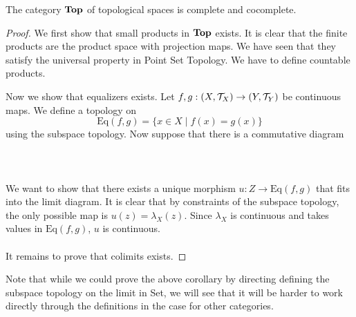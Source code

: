 \documentclass[a4paper]{article}
\begin{document}
\begin{crl}{}{} The category $\bold{Top}$ of topological spaces is complete and cocomplete. \tcbline
\begin{proof}
We first show that small products in $\bold{Top}$ exists. It is clear that the finite products are the product space with projection maps. We have seen that they satisfy the universal property in Point Set Topology. We have to define countable products. 

Now we show that equalizers exists. Let $f,g:(X,\mathcal{T}_X)\to(Y,\mathcal{T}_Y)$ be continuous maps. We define a topology on $$\text{Eq}(f,g)=\{x\in X\;|\;f(x)=g(x)\}$$ using the subspace topology. Now suppose that there is a commutative diagram \\~\\
 \\~\\
We want to show that there exists a unique morphism $u:Z\to\text{Eq}(f,g)$ that fits into the limit diagram. It is clear that by constraints of the subspace topology, the only possible map is $u(z)=\lambda_X(z)$. Since $\lambda_X$ is continuous and takes values in $\text{Eq}(f,g)$, $u$ is continuous. \\~\\

It remains to prove that colimits exists. 
\end{proof}
\end{crl}

Note that while we could prove the above corollary by directing defining the subspace topology on the limit in Set, we will see that it will be harder to work directly through the definitions in the case for other categories. 
\end{document}
